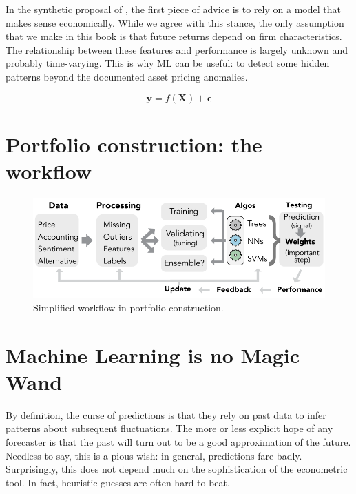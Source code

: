 \documentclass[]{krantz}
\theoremstyle{definition}
\theoremstyle{definition}
\theoremstyle{definition}
\theoremstyle{remark}
\begin{document}
In the synthetic proposal of \citet{arnott2019backtesting}, the first
piece of advice is to rely on a model that makes sense economically.
While we agree with this stance, the only assumption that we make in
this book is that future returns depend on firm characteristics. The
relationship between these features and performance is largely unknown
and probably time-varying. This is why ML can be useful: to detect some
hidden patterns beyond the documented asset pricing anomalies.

\begin{equation}
\mathbf{y}=f(\mathbf{X})+\mathbf{\epsilon}
\label{eq:ML}
\end{equation}

\hypertarget{portfolio-construction-the-workflow}{%
\section{Portfolio construction: the
workflow}\label{portfolio-construction-the-workflow}}

\begin{figure}[H]

{\centering \includegraphics[width=16.54in]{images/scheme2} 

}

\caption{Simplified workflow in portfolio construction.}\label{fig:figscheme2}
\end{figure}

\hypertarget{machine-learning-is-no-magic-wand}{%
\section{Machine Learning is no Magic
Wand}\label{machine-learning-is-no-magic-wand}}

By definition, the curse of predictions is that they rely on past data
to infer patterns about subsequent fluctuations. The more or less
explicit hope of any forecaster is that the past will turn out to be a
good approximation of the future. Needless to say, this is a pious wish:
in general, predictions fare badly. Surprisingly, this does not depend
much on the sophistication of the econometric tool. In fact, heuristic
guesses are often hard to beat.
\end{document}
